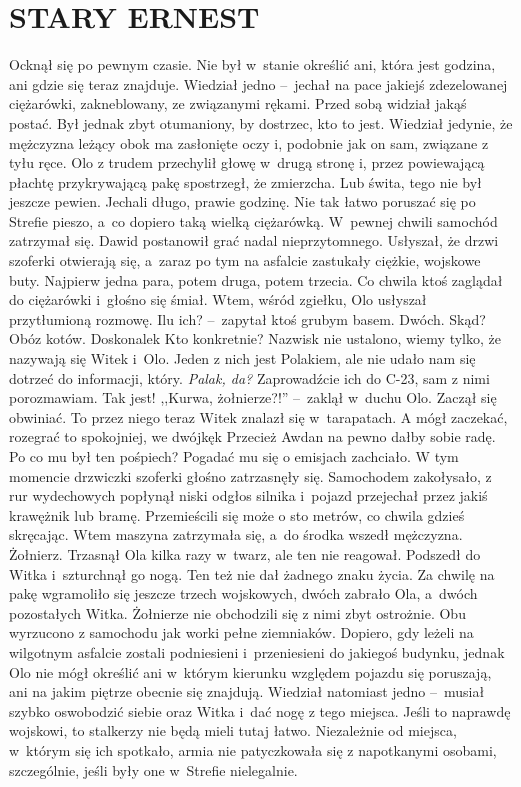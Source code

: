 \documentclass[../MAIN.tex]{subfiles}
\begin{document}
\section*{STARY ERNEST}
\mm Ocknął się po pewnym czasie. Nie był w~stanie określić ani, która jest godzina, ani gdzie się teraz znajduje. Wiedział jedno --~jechał na pace jakiejś zdezelowanej ciężarówki, zakneblowany, ze związanymi rękami. Przed sobą widział jakąś postać. Był jednak zbyt otumaniony, by dostrzec, kto to jest. Wiedział jedynie, że mężczyzna leżący obok ma zasłonięte oczy i, podobnie jak on sam, związane z tyłu ręce. Olo z trudem przechylił głowę w~drugą stronę i, przez powiewającą płachtę przykrywającą pakę spostrzegł, że zmierzcha. Lub świta, tego nie był jeszcze pewien.
Jechali długo, prawie godzinę. Nie tak łatwo poruszać się po Strefie pieszo, a~co dopiero taką wielką ciężarówką. W~pewnej chwili samochód zatrzymał się. Dawid postanowił grać nadal nieprzytomnego. Usłyszał, że drzwi szoferki otwierają się, a~zaraz po tym na asfalcie zastukały ciężkie, wojskowe buty. Najpierw jedna para, potem druga, potem trzecia. Co chwila ktoś zaglądał do ciężarówki i~głośno się śmiał. Wtem, wśród zgiełku, Olo usłyszał przytłumioną rozmowę.
\dd
\sd
\xx Ilu ich? --~zapytał ktoś grubym basem.
\xx Dwóch.
\xx Skąd?
\xx Obóz kotów.
\xx Doskonale\3k Kto konkretnie?
\xx Nazwisk nie ustalono, wiemy tylko, że nazywają się Witek i~Olo. Jeden z nich jest Polakiem, ale nie udało nam się dotrzeć do informacji, który.
\xx \textit{Palak, da?} Zaprowadźcie ich do C-23, sam z nimi porozmawiam.
\xx Tak jest!
\qd
\hspace{5.5em},,Kurwa, żołnierze?!'' --~zaklął w~duchu Olo. Zaczął się obwiniać. To przez niego teraz Witek znalazł się w~tarapatach. A mógł zaczekać, rozegrać to spokojniej, we dwójkę\3k Przecież Awdan na pewno dałby sobie radę. Po co mu był ten pośpiech? Pogadać mu się o emisjach zachciało.
\pp
W tym momencie drzwiczki szoferki głośno zatrzasnęły się. Samochodem zakołysało, z rur wydechowych popłynął niski odgłos silnika i~pojazd przejechał przez jakiś krawężnik lub bramę. Przemieścili się może o sto metrów, co chwila gdzieś skręcając. Wtem maszyna zatrzymała się, a~do środka wszedł mężczyzna. Żołnierz. Trzasnął Ola kilka razy w~twarz, ale ten nie reagował. Podszedł do Witka i~szturchnął go nogą. Ten też nie dał żadnego znaku życia. Za chwilę na pakę wgramoliło się jeszcze trzech wojskowych, dwóch zabrało Ola, a~dwóch pozostałych Witka.
\pp
Żołnierze nie obchodzili się z nimi zbyt ostrożnie. Obu wyrzucono z samochodu jak worki pełne ziemniaków. Dopiero, gdy leżeli na wilgotnym asfalcie zostali podniesieni i~przeniesieni do jakiegoś budynku, jednak Olo nie mógł określić ani w~którym kierunku względem pojazdu się poruszają, ani na jakim piętrze obecnie się znajdują. Wiedział natomiast jedno --~musiał szybko oswobodzić siebie oraz Witka i~dać nogę z tego miejsca. Jeśli to naprawdę wojskowi, to stalkerzy nie będą mieli tutaj łatwo. Niezależnie od miejsca, w~którym się ich spotkało, armia nie patyczkowała się z napotkanymi osobami, szczególnie, jeśli były one w~Strefie nielegalnie.
\end{document}
